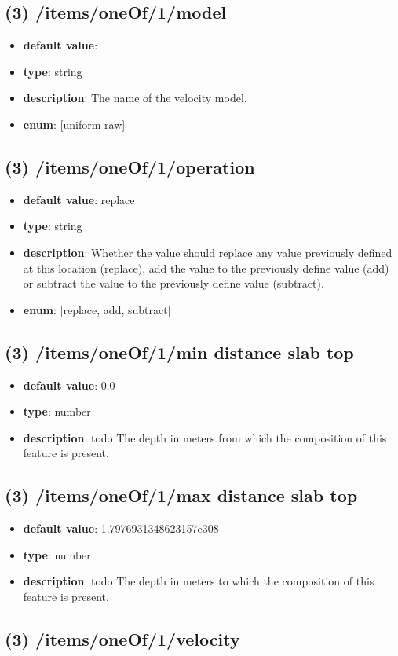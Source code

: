 \subsection{(3) /items/oneOf/1/model}
\begin{itemize}[leftmargin=3em]\item {\bf default value}: 
\item {\bf type}: string
\item {\bf description}: The name of the velocity model.
\item {\bf enum}: [uniform raw]\end{itemize}\subsection{(3) /items/oneOf/1/operation}
\begin{itemize}[leftmargin=3em]\item {\bf default value}: replace
\item {\bf type}: string
\item {\bf description}: Whether the value should replace any value previously defined at this location (replace), add the value to the previously define value (add) or subtract the value to the previously define value (subtract).
\item {\bf enum}: [replace, add, subtract]\end{itemize}\subsection{(3) /items/oneOf/1/min distance slab top}
\begin{itemize}[leftmargin=3em]\item {\bf default value}: 0.0
\item {\bf type}: number
\item {\bf description}: todo The depth in meters from which the composition of this feature is present.
\end{itemize}\subsection{(3) /items/oneOf/1/max distance slab top}
\begin{itemize}[leftmargin=3em]\item {\bf default value}: 1.7976931348623157e308
\item {\bf type}: number
\item {\bf description}: todo The depth in meters to which the composition of this feature is present.
\end{itemize}\subsection{(3) /items/oneOf/1/velocity}
